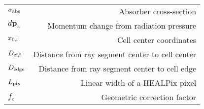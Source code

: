 \begin{table}
\begin{tabular}{lr}
$\sigma_{\rm abs}$ & Absorber cross-section \\
$d\mathbf{p}_\gamma$ & Momentum change from radiation pressure \\
$x_{\rm 0,i}$ & Cell center coordinates \\
$D_{\rm ci,i}$ & Distance from ray segment center to cell center \\
$D_{\rm edge}$ & Distance from ray segment center to cell edge \\
$L_{\rm pix}$ & Linear width of a HEALPix pixel \\
$f_c$ & Geometric correction factor \\
\hline
\end{tabular}
\end{table}
